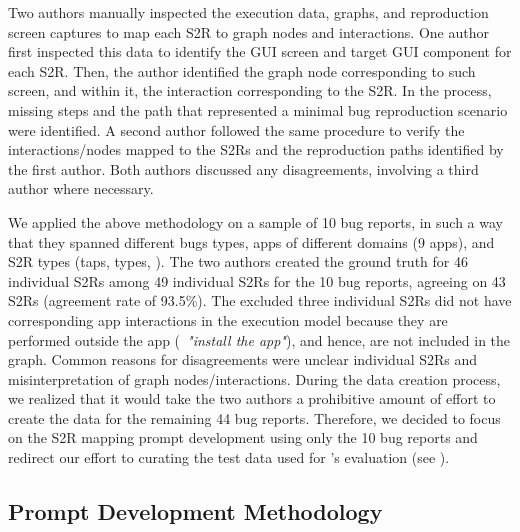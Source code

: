 Two authors manually inspected the execution data, graphs, and reproduction screen captures to map each S2R to graph nodes and interactions. 
One author first inspected this data to identify the GUI screen and target GUI component for each S2R. 
Then, the author identified the graph node corresponding to such screen, and within it, the interaction corresponding to the S2R. 
In the process, missing steps and the path that represented a minimal bug reproduction scenario were identified. 
A second author followed the same procedure to verify the interactions/nodes mapped to the S2Rs and the reproduction paths identified by the first author. 
Both authors discussed any disagreements, involving a third author where necessary.  

We applied the above methodology on a sample of 10 bug reports, in such a way that they spanned different bugs types, 
apps of different domains (9 apps), and S2R types (taps, types, \etc). 
The two authors created the ground truth for 46 individual S2Rs among 49 individual S2Rs for the 10 bug reports, agreeing on 43 S2Rs (agreement rate of 93.5\%). The excluded three individual S2Rs did not have corresponding app interactions in the execution model because they are performed outside the app (\eg\ \textit{"install the app"}), and hence, are not included in the graph.
Common reasons for disagreements were unclear individual S2Rs and misinterpretation of graph nodes/interactions. 
During the data creation process, we realized that it would take the two authors a prohibitive amount of effort to create the data for the remaining 44 bug reports. 
Therefore, we decided to focus on the S2R mapping prompt development using only the 10 bug reports and redirect our effort to curating the test data used for \tool's evaluation (see ). 

\subsection{Prompt Development Methodology}
\label{sec:prompt_development_methodology}

